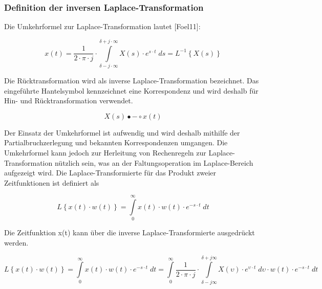 \subsubsection{Definition der inversen Laplace-Transformation}\label{fourthreeone}

\noindent Die Umkehrformel zur Laplace-Transformation lautet [Foel11]:

\begin{equation}\label{eq:fourhundredsix}
x\left(t\right)=\frac{1}{2\cdot \pi \cdot j} \cdot \int\limits _{\delta -j\cdot \infty }^{\delta +j\cdot \infty }X\left(s\right) \cdot e^{s\cdot t}\; ds=L^{-1} \left\{X\left(s\right)\right\}
\end{equation}

\noindent Die Rücktransformation wird als inverse Laplace-Transformation bezeichnet. Das eingeführte Hantelsymbol kennzeichnet eine Korrespondenz und wird deshalb für Hin- und Rücktransformation verwendet. 

\begin{equation}\label{eq:fourhundredseven}
X\left(s\right)\bullet -\circ x\left(t\right)
\end{equation}

\noindent Der Einsatz der Umkehrformel ist aufwendig und wird deshalb mithilfe der Partialbruchzerlegung und bekannten Korrespondenzen umgangen. Die Umkehrformel kann jedoch zur Herleitung von Rechenregeln zur Laplace-Transformation nützlich sein, was an der Faltungsoperation im Laplace-Bereich aufgezeigt wird. Die Laplace-Transformierte für das Produkt zweier Zeitfunktionen ist definiert als

\begin{equation}\label{eq:fourhundredeight}
L\left\{x\left(t\right)\cdot w\left(t\right)\right\}=\int\limits _{0}^{\infty }x\left(t\right)\cdot w\left(t\right)\cdot e^{-s\cdot t} \;dt
\end{equation}

\noindent Die Zeitfunktion x(t) kann über die inverse Laplace-Transformierte ausgedrückt werden.

\begin{equation}\label{eq:fourhundrednine}
L\left\{x\left(t\right)\cdot w\left(t\right)\right\}=\int\limits _{0}^{\infty }x\left(t\right)\cdot w\left(t\right)\cdot e^{-s\cdot t} \;dt =\int\limits _{0}^{\infty }\frac{1}{2\cdot \pi \cdot j} \cdot \int\limits _{\delta -j\infty }^{\delta +j\infty }X\left(\upsilon \right) \cdot e^{\upsilon \cdot t} \;d\upsilon \cdot w\left(t\right)\cdot e^{-s\cdot t} \;dt 
\end{equation}

